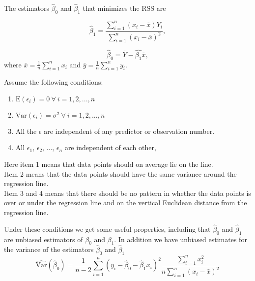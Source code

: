 \documentclass{article}
\begin{document}
The estimators \(\hat{\beta}_0\) and \(\hat{\beta}_1\) that minimizes the RSS are

\begin{equation} \label{eq:beta1}
 \hat{\beta}_1 = \frac{\sum_{i = 1}^n\left( x_i - \bar{x} \right) Y_i}{\sum_{i = 1}^n\left( x_i - \bar{x} \right)^2} ,
\end{equation}

\begin{equation} \label{eq:beta0}
 \hat{\beta}_0 = \bar{Y} - \hat{\beta_1}\bar{x},
\end{equation}
where \(\bar{x} = \frac{1}{n} \sum_{i = 1}^n x_i\) and \(\bar{y} = \frac{1}{n}
\sum_{i = 1}^n y_i\). \cite[Chapter 11]{st1101}

Assume the following conditions:

\begin{enumerate}
\item \(\mathrm{E} \left( \epsilon_i \right) = 0\ \forall \ i = 1, 2, ..., n\)
\item \(\mathrm{Var} \left( \epsilon_i \right) = \sigma^2\ \forall \ i = 1, 2, ..., n\)
\item All the \(\epsilon\) are independent of any predictor or observation number.
\item All \(\epsilon_1\), \(\epsilon_2\), ..., \(\epsilon_n\) are independent of each other,
\end{enumerate}

Here item 1 means that data points should on average lie on the line. \\
Item 2 means that the data points should have the same variance around the
regression line.  \\
Item 3 and 4 means that there should be no pattern in whether the data points is over
or under the regression line and on the vertical Euclidean distance from the
regression line.

Under these conditions we get some useful properties, including that \(\hat{\beta}_0\) and \(\hat{\beta}_1\) are unbiased estimators of
\(\beta_0\) and \(\beta_1\). In addition we have
unbiased estimates for the
variance of the estimators \(\hat{\beta}_0\) and \(\hat{\beta}_1\)
\begin{equation*}
 \widehat{\mathrm{Var}} \left( \hat{\beta}_0 \right) = \frac{1}{n - 2} \sum_{i = 1}^n\left( y_i - \hat{\beta}_0 -
 \hat{\beta}_1 x_i \right)^2 \frac{\sum_{i = 1}^n x_i^2}{n
   \sum_{i = 1}^n \left( x_i - \bar{x} \right)^2}
\end{equation*}
 
\end{document}
